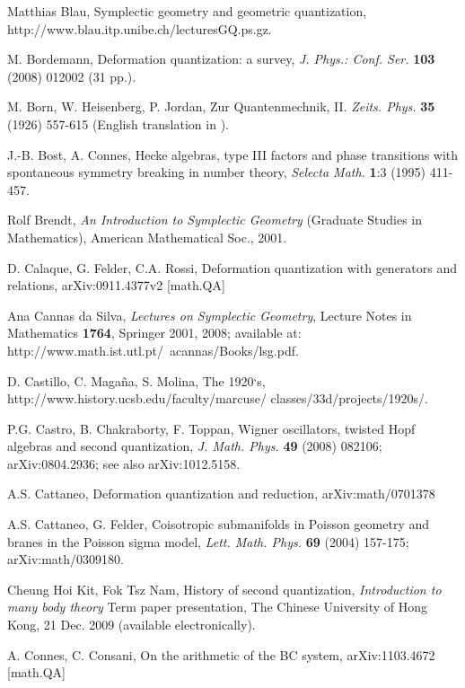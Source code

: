 \begin{thebibliography}{000}
 Matthias Blau, Symplectic geometry and geometric quantization,
http://www.blau.itp.unibe.ch/lecturesGQ.ps.gz.

 M. Bordemann, Deformation quantization: a survey, {\it J. Phys.: Conf. Ser.} {\bf 103} (2008) 012002 (31 pp.).

 M. Born, W. Heisenberg, P. Jordan, Zur Quantenmechnik, II. 
{\it Zeits. Phys.} {\bf 35} (1926) 557-615 (English translation in \cite{SQM}).

 J.-B. Bost, A. Connes, Hecke algebras, type III factors and
phase transitions with spontaneous symmetry breaking in number theory,
{\it Selecta Math.} {\bf 1}:3 (1995) 411-457.

 Rolf Brendt, {\it An Introduction to Symplectic Geometry}
(Graduate Studies in Mathematics), American Mathematical Soc., 2001.

  D. Calaque, G. Felder, C.A. Rossi, Deformation quantization with generators and relations, arXiv:0911.4377v2 [math.QA]  
   
 Ana Cannas da Silva, {\it Lectures on Symplectic Geometry},
Lecture Notes in Mathematics {\bf 1764}, Springer 2001, 2008; available at:\\ http://www.math.ist.utl.pt/~acannas/Books/lsg.pdf.

 D. Castillo, C. Maga\~na, S. Molina, The 1920‘s,  \\
http://www.history.ucsb.edu/faculty/marcuse/ classes/33d/projects/1920s/.

 P.G. Castro, B. Chakraborty, F. Toppan, Wigner oscillators,
twisted Hopf algebras and second quantization, {\it J. Math. Phys.}
{\bf 49} (2008) 082106; arXiv:0804.2936; see also arXiv:1012.5158.

 A.S. Cattaneo, Deformation quantization and reduction, arXiv:math/0701378

 A.S. Cattaneo, G. Felder, Coisotropic submanifolds in Poisson geometry and branes in the Poisson sigma model,
{\it Lett. Math. Phys.} {\bf 69} (2004) 157-175; arXiv:math/0309180. 
  
 Cheung Hoi Kit, Fok Tsz Nam, History of second
quantization, {\it Introduction to many body theory} Term paper presentation,
The Chinese University of Hong Kong, 21 Dec. 2009 (available electronically).

 A. Connes, C. Consani, On the arithmetic of the BC system,
arXiv:1103.4672 [math.QA]


\end{thebibliography}
